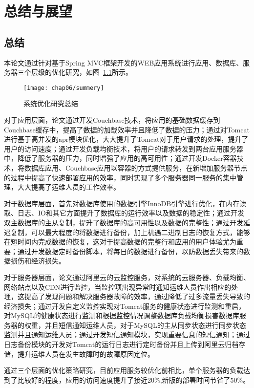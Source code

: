 \chapter{总结与展望}
\label{cha:summarize}
\section{总结}
本论文通过针对基于Spring MVC框架开发的WEB应用系统进行应用、数据库、服务器三个层级的优化研究，如图~\ref{fig:summery}所示。
\begin{figure}[H] %
  \centering
  \texttt{[image: chap06/summery]}
  \caption{系统优化研究总结}
  \label{fig:summery}
\end{figure}

对于应用层面，论文通过开发Couchbase技术，将应用的基础数据缓存到Couchbase缓存中，提高了数据的加载效率并且降低了数据的压力；通过对Tomcat进行基于高并发的apr模块优化，大大提升了Tomcat对于用户请求的处理，提升了用户的访问速度；通过开发负载均衡技术，将用户的请求转发到两台应用服务器中，降低了服务器的压力，同时增强了应用的高可用性；通过开发Docker容器技术，将数据库应用、Couchbase应用以容器的方式提供服务，在新增加服务器节点的过程中提高了快速部署应用的效率，同时实现了多个服务器同一服务的集中管理，大大提高了运维人员的工作效率。

对于数据库层面，首先对数据库使用的数据引擎InnoDB引擎进行优化，在内存读取、日志、IO和其它方面提升了数据库的运行效率以及数据的稳定性；通过开发双主数据库的主从复制，提升了数据库的高可用性以及数据的完整性；通过开发延迟复制，可以最大程度的将数据进行备份，加上机遇二进制日志的恢复方式，能够在短时间内完成数据的恢复，这对于提高数据的完整行和应用的用户体验尤为重要；通过开发数据定时备份脚本，将每日的数据进行备份，以防数据丢失带来的数据损伤和经济损失。

对于服务器层面，论文通过阿里云的云监控服务，对系统的云服务器、负载均衡、网络站点以及CDN进行监控，当监控项出现异常时通知运维人员作出相应的处理，这提高了发现问题和解决服务器故障的效率，通过降低了过多流量丢失导致的经济损失；通过开发自定义监控实现对Tomcat服务的健康状态进行监测和重启，对MySQL的健康状态进行监测和根据监控情况调整数据库负载均衡损害数据库服务器的权重，并且短信通知运维人员，对于MySQL的主从同步状态进行同步状态监测并且通知运维人员；通过开发短信通知模块，实现重要信息的短信通知；通过日志备份模块的开发对Tomcat的运行日志进行定时备份并且上传到阿里云归档存储，提升运维人员在发生故障时的故障原因定位。

通过三个层面的优化策略研究，目前应用服务较优化前相比，单个服务器的负载达到了比较好的程度，应用的访问速度提升了接近20\%,新版的部署时间节省了50\%。

